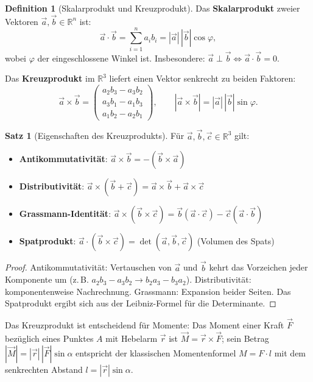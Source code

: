 ﻿\documentclass[a4paper,12pt]{report}
\theoremstyle{definition}
\newtheorem{definition}{Definition}
\newtheorem{satz}{Satz}
\begin{document}
\begin{definition}[Skalarprodukt und Kreuzprodukt]
Das \textbf{Skalarprodukt} zweier Vektoren $\vec{a}, \vec{b} \in \mathbb{R}^n$ ist:
\[
  \vec{a} \cdot \vec{b} = \sum_{i=1}^n a_i b_i = |\vec{a}|\,|\vec{b}|\cos\varphi,
\]
wobei $\varphi$ der eingeschlossene Winkel ist. Insbesondere:
$\vec{a} \perp \vec{b} \Leftrightarrow \vec{a}\cdot\vec{b} = 0$.

Das \textbf{Kreuzprodukt} im $\mathbb{R}^3$ liefert einen Vektor senkrecht
zu beiden Faktoren:
\[
  \vec{a} \times \vec{b} = \begin{pmatrix} a_2 b_3 - a_3 b_2 \\ a_3 b_1 - a_1 b_3 \\ a_1 b_2 - a_2 b_1 \end{pmatrix},
  \qquad |\vec{a} \times \vec{b}| = |\vec{a}|\,|\vec{b}|\sin\varphi.
\]
\end{definition}

\begin{satz}[Eigenschaften des Kreuzprodukts]
F\"ur $\vec{a}, \vec{b}, \vec{c} \in \mathbb{R}^3$ gilt:
\begin{itemize}
    \item[-] \textbf{Antikommutativit\"at}: $\vec{a} \times \vec{b} = -(\vec{b} \times \vec{a})$
    \item[-] \textbf{Distributivit\"at}: $\vec{a} \times (\vec{b} + \vec{c}) = \vec{a}\times\vec{b} + \vec{a}\times\vec{c}$
    \item[-] \textbf{Grassmann-Identit\"at}: $\vec{a} \times (\vec{b} \times \vec{c}) = \vec{b}(\vec{a}\cdot\vec{c}) - \vec{c}(\vec{a}\cdot\vec{b})$
    \item[-] \textbf{Spatprodukt}: $\vec{a}\cdot(\vec{b}\times\vec{c}) = \det(\vec{a},\vec{b},\vec{c})$ (Volumen des Spats)
\end{itemize}
\end{satz}
\begin{proof}
Antikommutativit\"at: Vertauschen von $\vec{a}$ und $\vec{b}$
kehrt das Vorzeichen jeder Komponente um (z.\,B. $a_2 b_3 - a_3 b_2 \to b_2 a_3 - b_3 a_2$).
Distributivit\"at: komponentenweise Nachrechnung. Grassmann: Expansion beider Seiten.
Das Spatprodukt ergibt sich aus der Leibniz-Formel f\"ur die Determinante.
\end{proof}

Das Kreuzprodukt ist entscheidend f\"ur Momente: Das Moment einer Kraft
$\vec{F}$ bez\"uglich eines Punktes $A$ mit Hebelarm $\vec{r}$ ist
$\vec{M} = \vec{r} \times \vec{F}$; sein Betrag $|\vec{M}| = |\vec{r}|\,|\vec{F}|\sin\alpha$
entspricht der klassischen Momentenformel $M = F \cdot l$ mit dem senkrechten Abstand $l = |\vec{r}|\sin\alpha$.
\end{document}
